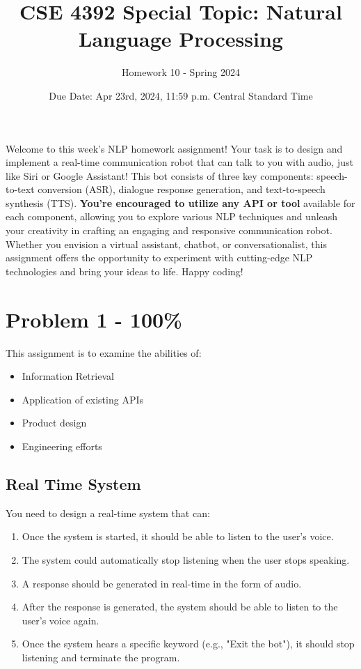 \documentclass{article}
\begin{document}
\title{CSE 4392 Special Topic: Natural Language Processing}
\author{Homework 10 - Spring 2024}
\date{Due Date: Apr 23rd, 2024, 11:59 p.m. Central Standard Time}
\maketitle
\thispagestyle{fancy}


Welcome to this week's NLP homework assignment! 
Your task is to design and implement a real-time communication robot that can
talk to you with audio, just like Siri or Google Assistant!
This bot consists of three key components: speech-to-text conversion (ASR), 
 dialogue response generation, and text-to-speech synthesis (TTS). 
 \textbf{You're encouraged to utilize any API or tool} available for each component, 
 allowing you to explore various NLP techniques and 
 unleash your creativity in crafting an engaging and 
 responsive communication robot. Whether you envision a virtual assistant,
 chatbot, or conversationalist, this assignment offers the opportunity
 to experiment with cutting-edge NLP technologies and bring your ideas to life. 
 Happy coding!

\section*{Problem 1 - 100\%}

This assignment is to examine the abilities of:
\begin{itemize}
    \item Information Retrieval
    \item Application of existing APIs
    \item Product design
    \item Engineering efforts
\end{itemize}

\subsection*{Real Time System}
You need to design a real-time system that can:
\begin{enumerate}
    \item Once the system is started, it should be able to listen to the user's voice.
    \item The system could automatically stop listening when the user stops speaking.
    \item A response should be generated in real-time in the form of audio.
    \item After the response is generated, the system should be able to listen to the 
user's voice again.
    \item Once the system hears a specific keyword (e.g., "Exit the bot"), 
it should stop listening and terminate the program.
\end{enumerate}
\end{document}
